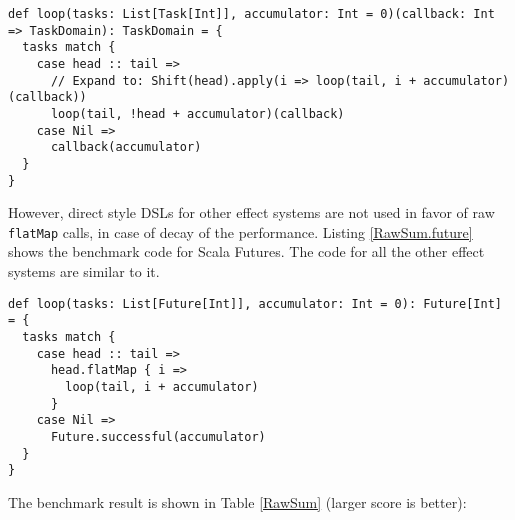 \begin{lstlisting}[float=htbp,caption={The most efficient implementation of sum based on ordinary CPS function},label={RawSum.dsl}]
def loop(tasks: List[Task[Int]], accumulator: Int = 0)(callback: Int => TaskDomain): TaskDomain = {
  tasks match {
    case head :: tail =>
      // Expand to: Shift(head).apply(i => loop(tail, i + accumulator)(callback))
      loop(tail, !head + accumulator)(callback)
    case Nil =>
      callback(accumulator)
  }
}
\end{lstlisting}

However, direct style DSLs for other effect systems are not used in favor of raw \lstinline{flatMap} calls, in case of decay of the performance. Listing \ref{RawSum.future} shows the benchmark code for Scala Futures. The code for all the other effect systems are similar to it.

\begin{lstlisting}[float=htbp,caption={The most efficient implementation of sum based on Scala Futures},label={RawSum.future}]
def loop(tasks: List[Future[Int]], accumulator: Int = 0): Future[Int] = {
  tasks match {
    case head :: tail =>
      head.flatMap { i =>
        loop(tail, i + accumulator)
      }
    case Nil =>
      Future.successful(accumulator)
  }
}
\end{lstlisting}

The benchmark result is shown in Table \ref{RawSum} (larger score is better):

